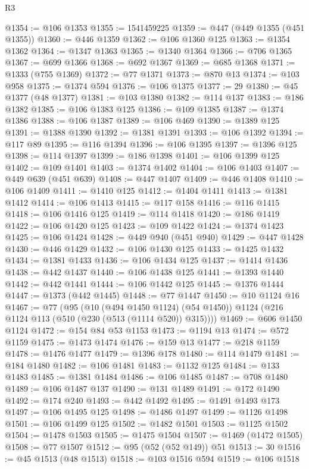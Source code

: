 \begin{lexlean}{R3}
\begin{coremodule}
@1354 := @106 @1353
@1355 := 1541459225
@1359 := @447 (@449 @1355 (@451 @1355))
@1360 := @446 @1359
@1362 := @106 @1360 @125
@1363 := @1354 @1362
@1364 := @1347 @1363
@1365 := @1340 @1364
@1366 := @706 @1365
@1367 := @699 @1366
@1368 := @692 @1367
@1369 := @685 @1368
@1371 := @1333 (@755 @1369)
@1372 := @77 @1371
@1373 := @870 @13
@1374 := @103 @958
@1375 := @1374 @594
@1376 := @106 @1375
@1377 := 29
@1380 := @45 @1377 (@48 @1377)
@1381 := @103 @1380
@1382 := @114 @137
@1383 := @186 @1382
@1385 := @106 @1383 @125
@1386 := @109 @1385
@1387 := @1374 @1386
@1388 := @106 @1387
@1389 := @106 @469
@1390 := @1389 @125
@1391 := @1388 @1390
@1392 := @1381 @1391
@1393 := @106 @1392
@1394 := @117 @89
@1395 := @116 @1394
@1396 := @106 @1395
@1397 := @1396 @125
@1398 := @114 @1397
@1399 := @186 @1398
@1401 := @106 @1399 @125
@1402 := @109 @1401
@1403 := @1374 @1402
@1404 := @106 @1403
@1407 := @449 @639 (@451 @639)
@1408 := @447 @1407
@1409 := @446 @1408
@1410 := @106 @1409
@1411 := @1410 @125
@1412 := @1404 @1411
@1413 := @1381 @1412
@1414 := @106 @1413
@1415 := @117 @158
@1416 := @116 @1415
@1418 := @106 @1416 @125
@1419 := @114 @1418
@1420 := @186 @1419
@1422 := @106 @1420 @125
@1423 := @109 @1422
@1424 := @1374 @1423
@1425 := @106 @1424
@1428 := @449 @940 (@451 @940)
@1429 := @447 @1428
@1430 := @446 @1429
@1432 := @106 @1430 @125
@1433 := @1425 @1432
@1434 := @1381 @1433
@1436 := @106 @1434 @125
@1437 := @1414 @1436
@1438 := @442 @1437
@1440 := @106 @1438 @125
@1441 := @1393 @1440
@1442 := @442 @1441
@1444 := @106 @1442 @125
@1445 := @1376 @1444
@1447 := @1373 (@442 @1445)
@1448 := @77 @1447
@1450 := @10 @1124 @16
@1467 := @77
    (@95
      (@10 (@494 @1450 @1124) (@54 @1450))
      @1124
      (@216 @1124 @113 (@510 (@230 (@513 (@1114 @520)) @315))))
@1469 := @606 @1450 @1124
@1472 := @154 @84 @53 @1153
@1473 := @1194 @13
@1474 := @572 @1159
@1475 := @1473 @1474
@1476 := @159 @13
@1477 := @218 @1159
@1478 := @1476 @1477
@1479 := @1396 @178
@1480 := @114 @1479
@1481 := @184 @1480
@1482 := @106 @1481
@1483 := @1132 @125
@1484 := @133 @1483
@1485 := @1381 @1484
@1486 := @106 @1485
@1487 := @708 @1480
@1489 := @106 @1487 @137
@1490 := @131 @1489
@1491 := @172 @1490
@1492 := @174 @240
@1493 := @442 @1492
@1495 := @1491 @1493 @173
@1497 := @106 @1495 @125
@1498 := @1486 @1497
@1499 := @1126 @1498
@1501 := @106 @1499 @125
@1502 := @1482 @1501
@1503 := @1125 @1502
@1504 := @1478 @1503
@1505 := @1475 @1504
@1507 := @1469 (@1472 @1505)
@1508 := @77 @1507
@1512 := @95 (@52 (@52 @149)) @51
@1513 := 30
@1516 := @45 @1513 (@48 @1513)
@1518 := @103 @1516 @594
@1519 := @106 @1518

\end{coremodule}
\end{lexlean}
